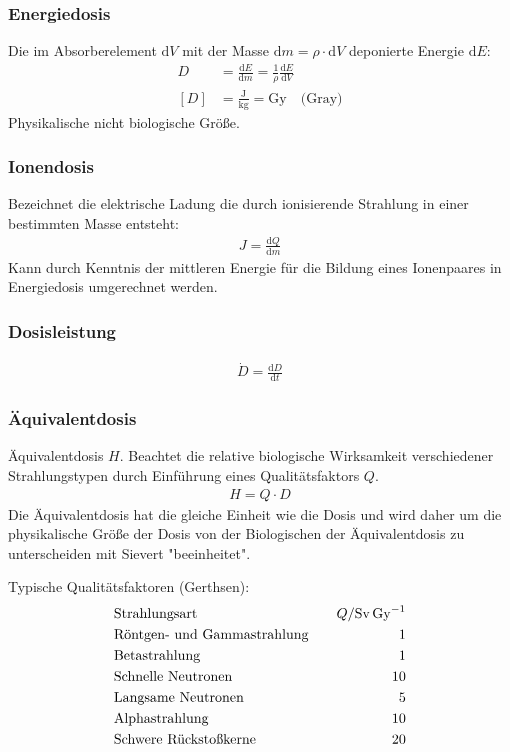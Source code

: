 \documentclass[11pt, a4paper]{article}
\numberwithin{equation}{section}
\begin{document}
\subsubsection{Energiedosis}
Die im Absorberelement $\mathrm{d}V$ mit der Masse $\mathrm{d} m = \rho \cdot \mathrm{d}V$ deponierte Energie $\mathrm{d}E$:
\begin{align}
	D &= \frac{\mathrm{d}E}{\mathrm{d}m} = \frac{1}{\rho}\frac{\mathrm{d}E}{\mathrm{d}V}\\
	[D] &= \frac{\mathrm{J}}{\mathrm{kg}} = \mathrm{Gy} \quad \text{(Gray)}
\end{align}
Physikalische nicht biologische Größe.

\subsubsection{Ionendosis}
\label{sec:ionendosis}
Bezeichnet die elektrische Ladung die durch ionisierende Strahlung in einer bestimmten Masse entsteht:
\begin{align}
	J = \frac{\mathrm{d}Q}{\mathrm{d}m}
\end{align}
Kann durch Kenntnis der mittleren Energie für die Bildung eines Ionenpaares in Energiedosis umgerechnet werden.

\subsubsection{Dosisleistung}
\begin{align}
	\dot{D} = \frac{\mathrm{d}D}{\mathrm{d}t}
\end{align}

\subsubsection{Äquivalentdosis}
Äquivalentdosis $H$.
Beachtet die relative biologische Wirksamkeit verschiedener Strahlungstypen durch Einführung eines Qualitätsfaktors $Q$.
\begin{align}
	H = Q \cdot D
\end{align}
Die Äquivalentdosis hat die gleiche Einheit wie die Dosis und wird daher um die physikalische Größe der Dosis von der Biologischen der Äquivalentdosis zu unterscheiden mit Sievert "beeinheitet".

Typische Qualitätsfaktoren (Gerthsen):
\begin{align*}
	&\text{Strahlungsart} \quad & Q / \si{Sv.Gy\tothe{-1}}\\
	&\text{Röntgen- und Gammastrahlung} \quad & 1 \\
	&\text{Betastrahlung} \quad & 1 \\
	&\text{Schnelle Neutronen} \quad & 10 \\
	&\text{Langsame Neutronen} \quad & 5 \\
	&\text{Alphastrahlung} \quad & 10 \\
	&\text{Schwere Rückstoßkerne} \quad & 20
\end{align*}
\end{document}
